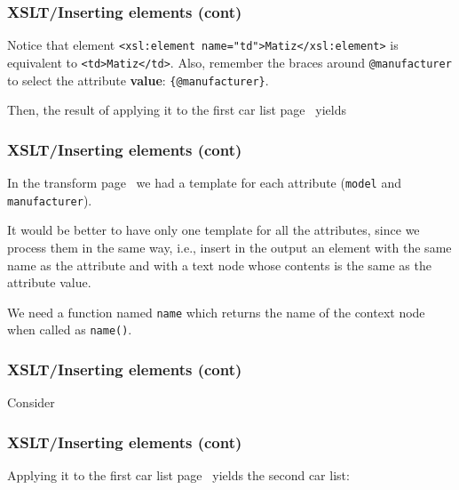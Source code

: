 %
\begin{frame}[containsverbatim]
\frametitle{XSLT/Inserting elements (cont)}

Notice that element
{\small\verb|<xsl:element name="td">Matiz</xsl:element>|} is
equivalent to {\small\verb|<td>Matiz</td>|}. Also, remember the braces
around \verb|@manufacturer| to select the attribute \textbf{value}:
\verb|{@manufacturer}|.

\bigskip

Then, the result of applying it to the first car list
page~\pageref{cars} yields 

\end{frame}

%
\begin{frame}
\frametitle{XSLT/Inserting elements (cont)}

In the transform page~\pageref{05list07.xsl} we had a template for
each attribute (\texttt{model} and \texttt{manufacturer}).

\bigskip

It would be better to have only one template for all the attributes,
since we process them in the same way, i.e., insert in the output an
element with the same name as the attribute and with a text node whose
contents is the same as the attribute value.

\bigskip

We need a function named \texttt{name} which returns the name of the
context node when called as \texttt{name()}.

\end{frame}

%
\begin{frame} 
\frametitle{XSLT/Inserting elements (cont)}

Consider

\end{frame}

%
\begin{frame} 
\frametitle{XSLT/Inserting elements (cont)}

Applying it to the first car list page~\pageref{cars} yields the
second car list: 

\end{frame}

